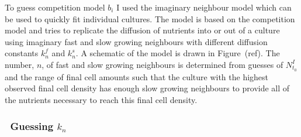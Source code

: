 To guess competition model \(b_{i}\) I used the imaginary neighbour
model which can be used to quickly fit individual cultures. The model
is based on the competition model and tries to replicate the diffusion
of nutrients into or out of a culture using imaginary fast and slow
growing neighbours with different diffusion constants \(k^{f}_{n}\)
and \(k^{s}_{n}\). A schematic of the model is drawn in
Figure~(ref). The number, \(n\), of fast and slow growing neighbours
is determined from guesses of \(N^{I}_{t_{0}}\) and the range of final
cell amounts such that the culture with the highest observed final
cell density has enough slow growing neighbours to provide all of the
nutrients necessary to reach this final cell density.


\subsubsection{\boldmath \thesubsubsection~Guessing \({k_{n}}\) \unboldmath}



